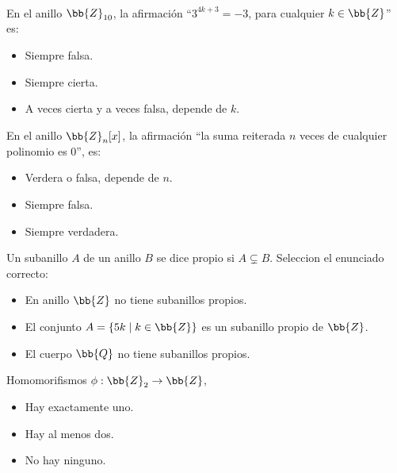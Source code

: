 \documentclass[12pt]{article}
\newcounter{ejercicio}[section] %
\newcounter{ejercicio}
\newcommand{\resetearcontador}{%
  \setcounter{ejercicio}{0} %
}
\begin{document}
    \newpage
    \ %
    \resetearcontador

    \begin{ejercicio}
        En el anillo $\bb{Z}_{10}$, la afirmación ``$3^{4k+3} = -3$, para cualquier $k \in \bb{Z}$'' es:
        \begin{itemize}
            \item Siempre falsa.
            \item Siempre cierta.
            \item A veces cierta y a veces falsa, depende de $k$.
        \end{itemize}
    \end{ejercicio}

    \begin{ejercicio}
        En el anillo $\bb{Z}_n[x]$, la afirmación ``la suma reiterada $n$ veces de cualquier polinomio es $0$'', es:
        \begin{itemize}
            \item Verdera o falsa, depende de $n$.
            \item Siempre falsa.
            \item Siempre verdadera.
        \end{itemize}
    \end{ejercicio}

    \begin{ejercicio}
        Un subanillo $A$ de un anillo $B$ se dice propio si $A \subsetneq B$. Seleccion el enunciado correcto:
        \begin{itemize}
            \item En anillo $\bb{Z}$ no tiene subanillos propios.
            \item El conjunto $A = \{ 5k \mid k \in \bb{Z} \}$ es un subanillo propio de $\bb{Z}$.
            \item El cuerpo $\bb{Q}$ no tiene subanillos propios.
        \end{itemize}
    \end{ejercicio}

    \begin{ejercicio}
        Homomorifismos $\phi : \bb{Z}_2 \rightarrow \bb{Z}$,
        \begin{itemize}
            \item Hay exactamente uno.
            \item Hay al menos dos.
            \item No hay ninguno.
        \end{itemize}
    \end{ejercicio}
\end{document}
